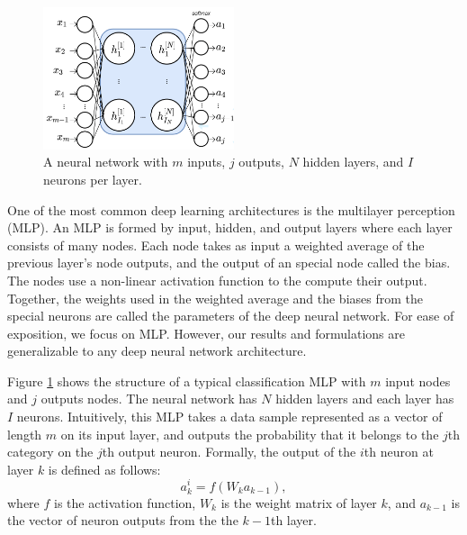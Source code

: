 \documentclass[conference]{IEEEtran}
\begin{document}
\begin{figure}[t]
\centering
\includegraphics[width=0.5\textwidth, keepaspectratio]{SimpleNN}
\caption{A neural network with $m$ inputs, $j$ outputs,  $N$  hidden layers, and $I$ neurons per layer.}
\label{fig:SimplNN}
\end{figure}
One of the most common deep learning architectures is the multilayer perception (MLP). 
An MLP is formed by input, hidden, and output layers where each layer consists of many nodes. Each node takes 
as input a weighted average of the previous layer's node outputs, and the output of an special node called the bias.  
The nodes use a non-linear activation function to the compute their output. Together, the weights used in the weighted average and
the biases from the special neurons are called the parameters of the deep neural network. 
For ease of exposition, we focus on MLP. However, our results and formulations are generalizable to any deep neural network
architecture. 




Figure \ref{fig:SimplNN} shows the structure of a typical classification MLP with $m$ input nodes and $j$ outputs nodes. The neural network
has $N$ hidden layers and each layer has $I$ neurons. Intuitively, this MLP takes a data sample represented as a vector of length
$m$ on its input layer, and outputs the probability that it belongs to the $j$th category on the $j$th output neuron.
Formally, the output of the $i$th neuron at layer $k$ is defined as follows:
$$a^i_k=f(W_k a_{k-1}),$$
where $f$ is the activation function, $W_k$ is the weight matrix of layer $k$,
and $a_{k-1}$ is the vector of neuron outputs from the the $k-1$th layer. 
\end{document}
